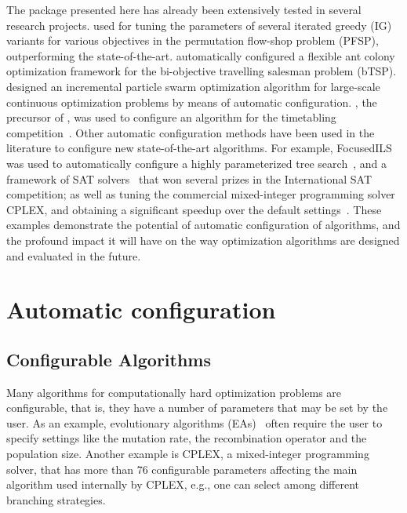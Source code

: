 \documentclass[article,a4paper,nojss,notitle]{jss}
\newcommand{\eg}{e.g.}%
\newcommand{\MANUEL}[1]{{\footnotesize\noindent\textbf{[~MANUEL: #1~]}}}
\newcommand{\irace}{\pkg{irace}\xspace}
\newcommand{\FRACE}{\text{F-Race}\xspace}
\newcommand{\IFRACE}{\text{I/F-Race}\xspace}
\begin{document}
The \irace package presented here has already been extensively tested
in several research
projects. \citet{DubLopStu2011amai,DubLopStu2011cor} used \irace for
tuning the parameters of several iterated greedy (IG) variants for
various objectives in the permutation flow-shop problem (PFSP),
outperforming the state-of-the-art.  \citet{LopStu2010:ants}
automatically configured a flexible ant colony optimization framework
for the bi-objective travelling salesman problem
(bTSP). \citet{MonAydStu2011soco} designed an incremental particle
swarm optimization algorithm for large-scale continuous optimization
problems by means of automatic configuration. \FRACE, the precursor of
\IFRACE, was used to configure an algorithm for the timetabling
competition~\citep{ChiBirSocRos2006jos}. Other automatic configuration
methods have been used in the literature to configure new
state-of-the-art algorithms. For example,
FocusedILS~\citep{HutHooLeyStu2009jair} was used to automatically
configure a highly parameterized tree
search~\citep{HutBabHooHu2007fmcad}, and a framework of SAT
solvers~\citep{KhuXuHooLey2009:satenstein} that won several prizes in
the International SAT competition; as well as tuning the commercial
mixed-integer programming solver CPLEX, and obtaining a significant
speedup over the default settings~\citep{HutHooLey2010:cpaior}.
%
These examples demonstrate the potential of automatic configuration of
algorithms, and the profound impact it will have on the way
optimization algorithms are designed and evaluated in the future.

\section{Automatic configuration}\label{sec:prelim}

\subsection{Configurable Algorithms}

Many algorithms for computationally hard optimization problems are
configurable, that is, they have a number of parameters that may be
set by the user. As an example, evolutionary algorithms
(EAs)~\citep{Goldberg89} often require the user to specify settings
like the mutation rate, the recombination operator and the population
size. Another example is CPLEX, a mixed-integer programming solver,
that has more than $76$ configurable parameters affecting the main
algorithm used internally by CPLEX, \eg{}, one can select among
different branching strategies.
\end{document}
